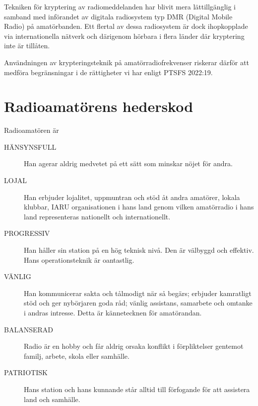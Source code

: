Tekniken för kryptering av radiomeddelanden har blivit mera lättillgänglig i
samband med införandet av digitala radiosystem typ DMR (Digital Mobile Radio) på
amatörbanden.
Ett flertal av dessa radiosystem är dock ihopkopplade via internationella
nätverk och därigenom hörbara i flera länder där kryptering inte är tillåten.

Användningen av krypteringsteknik på amatörradiofrekvenser riskerar därför att
medföra begränsningar i de rättigheter vi har enligt PTSFS 2022:19.

\newpage %
\section[Hederskod]{Radioamatörens hederskod}

Radioamatören är

\begin{description}
  \item[HÄNSYNSFULL] Han agerar aldrig medvetet på ett sätt som minskar nöjet för andra.

  \item[LOJAL] Han erbjuder lojalitet, uppmuntran och stöd åt andra amatörer, lokala klubbar,
    IARU organisationen i hans land genom vilken amatörradio i hans land
    representeras nationellt och internationellt.

  \item[PROGRESSIV] Han håller sin station på en hög teknisk nivå. Den är välbyggd och effektiv.
    Hans operationsteknik är oantastlig.

  \item[VÄNLIG] Han kommunicerar sakta och tålmodigt när så begärs; erbjuder kamratligt stöd och ger nybörjaren goda råd; vänlig assistans, samarbete och omtanke i andras intresse. Detta är kännetecknen för amatörandan.

  \item[BALANSERAD] Radio är en hobby och får aldrig orsaka konflikt i förpliktelser gentemot
    familj, arbete, skola eller samhälle.

  \item[PATRIOTISK] Hans station och hans kunnande står alltid till förfogande för att
    assistera land och samhälle.
\end{description}

  
